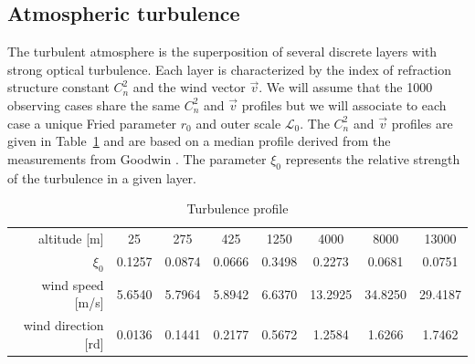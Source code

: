 \documentclass{gmto}
\begin{document}
\clearpage

\subsection{Atmospheric turbulence}
\label{sec:atm-param}

The turbulent atmosphere is the superposition of several discrete layers with
strong optical turbulence.
Each layer is characterized by the index of refraction structure constant
$C_n^2$ and the wind vector $\vec v$.
We will assume that the 1000 observing cases share the same $C_n^2$ and $\vec v$
profiles but we will associate to each case a unique Fried parameter $r_0$ and
outer scale $\mathcal L_0$.
The $C_n^2$ and $\vec v$ profiles are given in Table~\ref{tab:1} and are based on a median
profile derived from the measurements from Goodwin \cite{Goodwin}.
The parameter $\xi_0$ represents the relative strength of the turbulence in a given layer.
\begin{table}
  \centering
  \begin{tabular}{r|*{7}c}\toprule
    altitude [m] & 25 & 275 & 425 & 1250 & 4000 & 8000 & 13000\\
    $\xi_0$ & 0.1257 & 0.0874 & 0.0666 & 0.3498 & 0.2273 & 0.0681 & 0.0751\\
    wind speed [m/s] & 5.6540 & 5.7964 & 5.8942 & 6.6370 & 13.2925 & 34.8250 & 29.4187\\
    wind direction [rd] & 0.0136 & 0.1441 & 0.2177 & 0.5672 & 1.2584 & 1.6266 & 1.7462\\\bottomrule
  \end{tabular}
  \caption{Turbulence profile}
  \label{tab:1}
\end{table}
\end{document}

